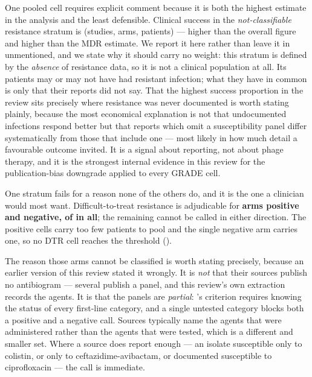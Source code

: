 One pooled cell requires explicit comment because it is both the highest estimate in the analysis and the least defensible. Clinical success in the \emph{not-classifiable} resistance stratum is \CsResNotClassifiableEstCI (\CsResNotClassifiableK studies, \CsResNotClassifiableArms arms, \CsResNotClassifiableN patients) --- higher than the overall figure and higher than the MDR estimate. We report it here rather than leave it in  unmentioned, and we state why it should carry no weight: this stratum is defined by the \emph{absence} of resistance data, so it is not a clinical population at all. Its patients may or may not have had resistant infection; what they have in common is only that their reports did not say. That the highest success proportion in the review sits precisely where resistance was never documented is worth stating plainly, because the most economical explanation is not that undocumented infections respond better but that reports which omit a susceptibility panel differ systematically from those that include one --- most likely in how much detail a favourable outcome invited. It is a signal about reporting, not about phage therapy, and it is the strongest internal evidence in this review for the publication-bias downgrade applied to every GRADE cell.

One stratum fails for a reason none of the others do, and it is the one a clinician would most want. Difficult-to-treat resistance is adjudicable for \textbf{\DtrYesArms arms positive and \DtrNoArms negative, \DtrAdjudicable of \ArmsAnalysed in all}; the remaining \DtrNotDerivableArms cannot be called in either direction. The positive cells carry too few patients to pool and the single negative arm carries one, so no DTR cell reaches the threshold ().

The reason those \DtrNotDerivableArms arms cannot be classified is worth stating precisely, because an earlier version of this review stated it wrongly. It is \emph{not} that their sources publish no antibiogram --- several publish a panel, and this review's own extraction records the agents. It is that the panels are \emph{partial}: \textcite{Kadri2018_dtr}'s criterion requires knowing the status of every first-line category, and a single untested category blocks both a positive and a negative call. Sources typically name the agents that were administered rather than the agents that were tested, which is a different and smaller set. Where a source does report enough --- an isolate susceptible only to colistin, or only to ceftazidime-avibactam, or documented susceptible to ciprofloxacin --- the call is immediate.

